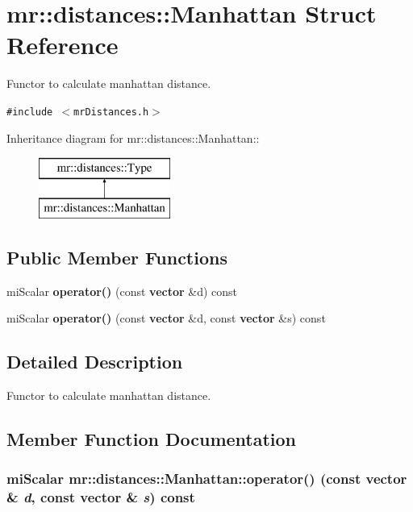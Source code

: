 \section{mr::distances::Manhattan Struct Reference}
\label{structmr_1_1distances_1_1Manhattan}
Functor to calculate manhattan distance.  


{\tt \#include $<$mr\-Distances.h$>$}

Inheritance diagram for mr::distances::Manhattan::\begin{figure}[H]
\begin{center}
\leavevmode
\includegraphics[height=2cm]{structmr_1_1distances_1_1Manhattan}
\end{center}
\end{figure}
\subsection*{Public Member Functions}
\begin{CompactItemize}
\item 
mi\-Scalar {\bf operator()} (const {\bf vector} \&d) const 
\item 
mi\-Scalar {\bf operator()} (const {\bf vector} \&d, const {\bf vector} \&s) const 
\end{CompactItemize}


\subsection{Detailed Description}
Functor to calculate manhattan distance. 



\subsection{Member Function Documentation}
\subsubsection{\setlength{\rightskip}{0pt plus 5cm}mi\-Scalar mr::distances::Manhattan::operator() (const {\bf vector} \& {\em d}, const {\bf vector} \& {\em s}) const\hspace{0.3cm}{\tt  [inline, virtual]}}\label{structmr_1_1distances_1_1Manhattan_a1}




